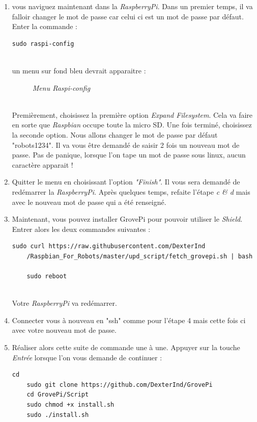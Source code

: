 \begin{enumerate}
\begin{enumerate}
	\item vous naviguez maintenant dans la \textit{RaspberryPi}. Dans un premier temps, il va falloir changer le mot de passe car celui ci est un mot de passe par défaut. Enter la commande :\\
	\begin{lstlisting}[style=MyBashStyle]
	sudo raspi-config
	\end{lstlisting}\\
	un menu sur fond bleu devrait apparaitre :\\
	
\begin{figure}[H]
\begin{center}
\end{center}
	\caption{ \textit{Menu Raspi-config}}
\end{figure}\\

Premièrement, choisissez la première option \textit{Expand Filesystem}. Cela va faire en sorte que \textit{Raspbian} occupe toute la micro SD. Une fois terminé, choisissez la seconde option. Nous allons changer le mot de passe par défaut "robots1234". Il va vous être demandé de saisir 2 fois un nouveau mot de passe. Pas de panique, lorsque l'on tape un mot de passe sous linux, aucun caractère apparait !
	
	\item Quitter le menu en choisissant l'option \textit{"Finish"}. Il vous sera demandé de redémarrer la \textit{RaspberryPi}. Après quelques temps, refaite l'étape \textit{c & d} mais avec le nouveau mot de passe qui a été renseigné.
	\item Maintenant, vous pouvez installer GrovePi pour pouvoir utiliser le \textit{Shield}. Entrer alors les deux commandes suivantes :\\
	\begin{lstlisting}[style=MyBashStyle]
	sudo curl https://raw.githubusercontent.com/DexterInd
	/Raspbian_For_Robots/master/upd_script/fetch_grovepi.sh | bash
	 
	sudo reboot
	\end{lstlisting}\\
	Votre \textit{RaspberryPi} va redémarrer.
	\item Connecter vous à nouveau en "ssh" comme pour l'étape 4 mais cette fois ci avec votre nouveau mot de passe.
	\item Réaliser alors cette suite de commande une à une. Appuyer sur la touche \textit{Entrée} lorsque l'on vous demande de continuer :
	\begin{lstlisting}[style=MyBashStyle]
	cd
	sudo git clone https://github.com/DexterInd/GrovePi
	cd GrovePi/Script
	sudo chmod +x install.sh
	sudo ./install.sh
	\end{lstlisting}\\
	

\end{enumerate}
\end{enumerate}
